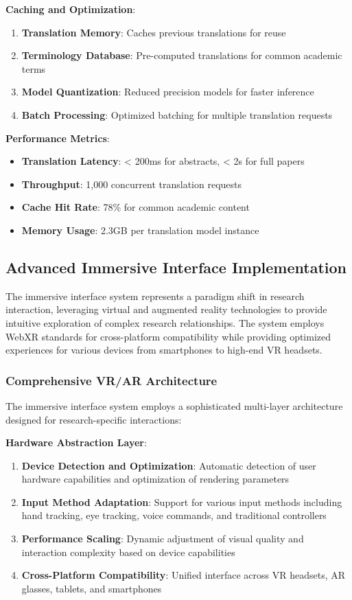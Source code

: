 \documentclass[10pt,twocolumn]{article}
\begin{document}
\textbf{Caching and Optimization}:
\begin{enumerate}
    \item \textbf{Translation Memory}: Caches previous translations for reuse
    \item \textbf{Terminology Database}: Pre-computed translations for common academic terms
    \item \textbf{Model Quantization}: Reduced precision models for faster inference
    \item \textbf{Batch Processing}: Optimized batching for multiple translation requests
\end{enumerate}

\textbf{Performance Metrics}:
\begin{itemize}
    \item \textbf{Translation Latency}: < 200ms for abstracts, < 2s for full papers
    \item \textbf{Throughput}: 1,000 concurrent translation requests
    \item \textbf{Cache Hit Rate}: 78\% for common academic content
    \item \textbf{Memory Usage}: 2.3GB per translation model instance
\end{itemize}

\subsection{Advanced Immersive Interface Implementation}

The immersive interface system represents a paradigm shift in research interaction, leveraging virtual and augmented reality technologies to provide intuitive exploration of complex research relationships. The system employs WebXR standards for cross-platform compatibility while providing optimized experiences for various devices from smartphones to high-end VR headsets.

\subsubsection{Comprehensive VR/AR Architecture}

The immersive interface system employs a sophisticated multi-layer architecture designed for research-specific interactions:

\textbf{Hardware Abstraction Layer}:
\begin{enumerate}
    \item \textbf{Device Detection and Optimization}: Automatic detection of user hardware capabilities and optimization of rendering parameters
    \item \textbf{Input Method Adaptation}: Support for various input methods including hand tracking, eye tracking, voice commands, and traditional controllers
    \item \textbf{Performance Scaling}: Dynamic adjustment of visual quality and interaction complexity based on device capabilities
    \item \textbf{Cross-Platform Compatibility}: Unified interface across VR headsets, AR glasses, tablets, and smartphones
\end{enumerate}
\end{document}
